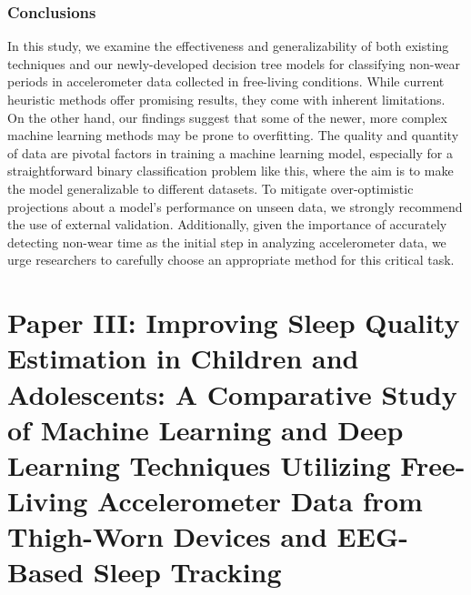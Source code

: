 \documentclass[
  9pt,
]{scrbook}
\begin{document}
\hypertarget{conclusions-1}{%
\subsection{Conclusions}\label{conclusions-1}}

In this study, we examine the effectiveness and generalizability of both
existing techniques and our newly-developed decision tree models for
classifying non-wear periods in accelerometer data collected in
free-living conditions. While current heuristic methods offer promising
results, they come with inherent limitations. On the other hand, our
findings suggest that some of the newer, more complex machine learning
methods may be prone to overfitting. The quality and quantity of data
are pivotal factors in training a machine learning model, especially for
a straightforward binary classification problem like this, where the aim
is to make the model generalizable to different datasets. To mitigate
over-optimistic projections about a model's performance on unseen data,
we strongly recommend the use of external validation. Additionally,
given the importance of accurately detecting non-wear time as the
initial step in analyzing accelerometer data, we urge researchers to
carefully choose an appropriate method for this critical task.

\newpage

\hypertarget{paper-iii-improving-sleep-quality-estimation-in-children-and-adolescents-a-comparative-study-of-machine-learning-and-deep-learning-techniques-utilizing-free-living-accelerometer-data-from-thigh-worn-devices-and-eeg-based-sleep-tracking}{%
\chapter{Paper III: Improving Sleep Quality Estimation in Children and
Adolescents: A Comparative Study of Machine Learning and Deep Learning
Techniques Utilizing Free-Living Accelerometer Data from Thigh-Worn
Devices and EEG-Based Sleep
Tracking}\label{paper-iii-improving-sleep-quality-estimation-in-children-and-adolescents-a-comparative-study-of-machine-learning-and-deep-learning-techniques-utilizing-free-living-accelerometer-data-from-thigh-worn-devices-and-eeg-based-sleep-tracking}}
\end{document}
